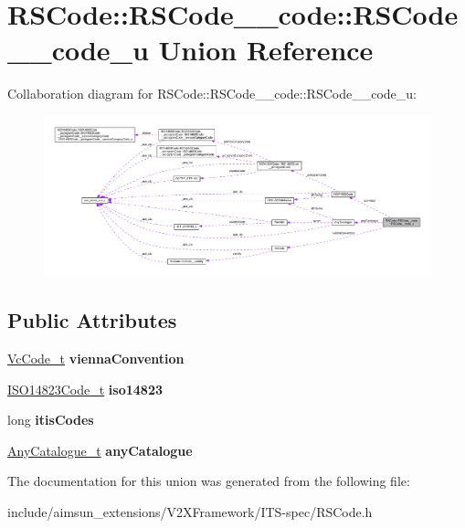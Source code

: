 \hypertarget{unionRSCode_1_1RSCode____code_1_1RSCode____code__u}{}\section{R\+S\+Code\+:\+:R\+S\+Code\+\_\+\+\_\+code\+:\+:R\+S\+Code\+\_\+\+\_\+code\+\_\+u Union Reference}
\label{unionRSCode_1_1RSCode____code_1_1RSCode____code__u}


Collaboration diagram for R\+S\+Code\+:\+:R\+S\+Code\+\_\+\+\_\+code\+:\+:R\+S\+Code\+\_\+\+\_\+code\+\_\+u\+:\nopagebreak
\begin{figure}[H]
\begin{center}
\leavevmode
\includegraphics[width=350pt]{unionRSCode_1_1RSCode____code_1_1RSCode____code__u__coll__graph}
\end{center}
\end{figure}
\subsection*{Public Attributes}
\begin{DoxyCompactItemize}
\item 
\hyperlink{structVcCode}{Vc\+Code\+\_\+t} {\bfseries vienna\+Convention}\hypertarget{unionRSCode_1_1RSCode____code_1_1RSCode____code__u_a17407c9b65d9ce605f68adaec8bd99cc}{}\label{unionRSCode_1_1RSCode____code_1_1RSCode____code__u_a17407c9b65d9ce605f68adaec8bd99cc}

\item 
\hyperlink{structISO14823Code}{I\+S\+O14823\+Code\+\_\+t} {\bfseries iso14823}\hypertarget{unionRSCode_1_1RSCode____code_1_1RSCode____code__u_a5aaed2efe68804247fd92e19b08e3287}{}\label{unionRSCode_1_1RSCode____code_1_1RSCode____code__u_a5aaed2efe68804247fd92e19b08e3287}

\item 
long {\bfseries itis\+Codes}\hypertarget{unionRSCode_1_1RSCode____code_1_1RSCode____code__u_a9b46ac463cfa638b00584c823bed7d58}{}\label{unionRSCode_1_1RSCode____code_1_1RSCode____code__u_a9b46ac463cfa638b00584c823bed7d58}

\item 
\hyperlink{structAnyCatalogue}{Any\+Catalogue\+\_\+t} {\bfseries any\+Catalogue}\hypertarget{unionRSCode_1_1RSCode____code_1_1RSCode____code__u_adc6b64f0d833cb1eca7077fa6faf0063}{}\label{unionRSCode_1_1RSCode____code_1_1RSCode____code__u_adc6b64f0d833cb1eca7077fa6faf0063}

\end{DoxyCompactItemize}


The documentation for this union was generated from the following file\+:\begin{DoxyCompactItemize}
\item 
include/aimsun\+\_\+extensions/\+V2\+X\+Framework/\+I\+T\+S-\/spec/R\+S\+Code.\+h\end{DoxyCompactItemize}
